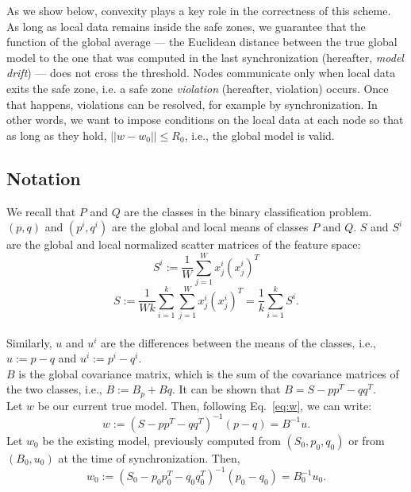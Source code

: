 \par As we show below, convexity plays a key role in the correctness of this scheme. As long as local data remains inside the safe zones, we guarantee that the function of the global average ---  the Euclidean distance between the true global model to the one that was computed in the last synchronization (hereafter, \emph{model drift}) --- does not cross the threshold.
Nodes communicate only when local data exits the
safe zone, i.e.  a safe zone \textit{violation} (hereafter,
violation) occurs. Once that happens, violations can be resolved,
for example by synchronization.
In other words, we want to impose conditions on the local
data at each node so that as long as they hold, $||w-w_0|| \leq R_0$, i.e., the global model is valid.

\subsection{Notation}
\noindent
We recall that $P$ and $Q$ are the classes in the binary classification problem.
 $(p,q)$ and $(p^i,q^i)$  are the global and local means of classes $P$ and $Q$.
$S$ and $S^i$  are the global and local normalized scatter matrices of the feature space:
\begin{equation*}
S^i := \frac{1}{W}\sum_{j=1}^{W}x^i_j(x^i_j)^T
\end{equation*}
\begin{equation*}
S := \frac{1}{Wk}
\sum_{i=1}^k\sum_{j=1}^Wx^i_j(x^i_j)^T=\frac{1}{k}\sum_{i=1}^kS^i.
\end{equation*}
\\Similarly, $u$ and $u^i$ are the differences between the means of the classes, i.e., $u:=p - q$ and $u^i:=p^i - q^i$.
\\ $B$ is the global covariance matrix, which is the sum of the covariance matrices of the two classes, i.e., $B:=B_p+Bq$.
It can be shown that $B=S - pp^T - qq^T$.
\\Let $w$ be our current true model. Then, following Eq.~\ref{eq:w}, we can write:
\begin{equation}
w:=(S - pp^T - qq^T)^{-1}(p-q)=B^{-1}u.
\end{equation}
Let $w_0$ be the existing model, previously computed from $(S_0, p_0, q_0)$
or from $(B_0,u_0)$ at the time of synchronization.
Then,
\begin{equation}
w_0:=(S_0 - p_0p_0^T - q_0q_0^T)^{-1}(p_0-q_0)=B_0^{-1}u_0.
\end{equation}

